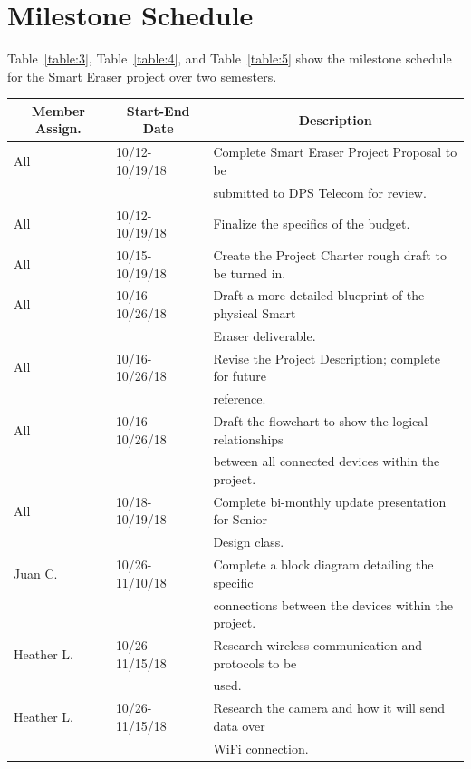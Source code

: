\section{Milestone Schedule}
Table~\ref{table:3}, Table~\ref{table:4}, and Table~\ref{table:5} show the milestone schedule for the Smart Eraser project over two semesters.
\setlength{\parindent}{5ex}
\begin{table} [H]	
	\normalsize
	\centering
	\begin{tabular}{|l|l|l|}
		\hline
		\multicolumn{1}{|c|}{\textbf{Member Assign.}} & \multicolumn{1}{|c|}{\textbf{Start-End Date}} & \multicolumn{1}{|c|}{\textbf{Description}} \\
		\hline
		All & 10/12-10/19/18 & Complete Smart Eraser Project Proposal to be\\
		& & submitted to DPS Telecom for review. \\
		\hline
		All & 10/12-10/19/18 & Finalize the specifics of the budget. \\
		\hline
		All & 10/15-10/19/18 & 
		Create the Project Charter rough draft to be turned in.\\
		\hline
		All & 10/16-10/26/18 & Draft a more detailed blueprint of the physical Smart \\
		& & Eraser deliverable. \\
		\hline
		All & 10/16-10/26/18 & 
		Revise the Project Description; complete for future\\
		& & reference. \\
		\hline
		All & 10/16-10/26/18 & 
		Draft the flowchart to show the logical relationships \\
		& & between all connected devices within the project.\\
		\hline
		All & 10/18-10/19/18 & 
		Complete bi-monthly update presentation for Senior \\
		& & Design class. \\
		\hline
		Juan C. & 10/26-11/10/18 & 
		Complete a block diagram detailing the specific \\
		& & connections between the devices within the project.\\
		\hline
		Heather L. & 10/26-11/15/18 & 
		Research wireless communication and protocols to be\\
		& & used. \\
		\hline
		Heather L. & 10/26-11/15/18 & 
		Research the camera and how it will send data over  \\
		& & WiFi connection.\\

\end{tabular}
\end{table}
